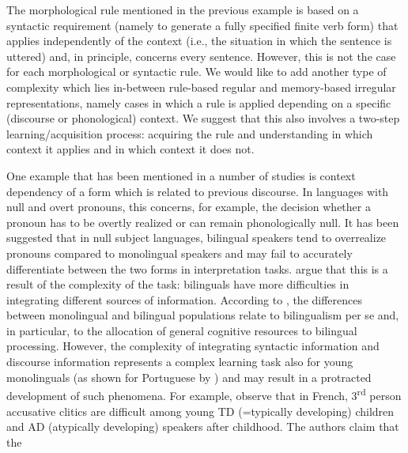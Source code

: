 \documentclass[output=paper]{langscibook}
\begin{document}
The morphological rule mentioned in the previous example is based on a syntactic requirement (namely to generate a fully specified finite verb form) that applies independently of the context (i.e., the situation in which the sentence is uttered) and, in principle, concerns every sentence. However, this is not the case for each morphological or syntactic rule. We would like to add another type of complexity which lies in-between rule-based regular and memory-based irregular representations, namely cases in which a rule is applied depending on a specific (discourse or phonological) context. We suggest that this also involves a two-step learning\slash acquisition process: acquiring the rule and understanding in which context it applies and in which context it does not. 

One example that has been mentioned in a number of studies is context dependency of a form which is related to previous discourse. In languages with null and overt pronouns, this concerns, for example, the decision whether a pronoun has to be overtly realized or can remain phonologically null. It has been suggested that in null subject languages, bilingual speakers tend to overrealize pronouns compared to monolingual speakers and may fail to accurately differentiate between the two forms in interpretation tasks. \citet[464]{SoraceBaldo2009} argue that this is a result of the complexity of the task: bilinguals have more difficulties in integrating different sources of information. According to \citet{Sorace2011}, the differences between monolingual and bilingual populations relate to bilingualism per se and, in particular, to the allocation of general cognitive resources to bilingual processing. However, the complexity of integrating syntactic information and discourse information represents a complex learning task also for young monolinguals (as shown for Portuguese by \citealt{LoboSilva2016, RinkeFlores2018}) and may result in a protracted development of such phenomena. For example, \citet{TullerBarthez2011} observe that in French, 3\textsuperscript{rd} person accusative clitics are difficult among young TD (=typically developing) children and AD (atypically developing) speakers after childhood. The authors claim that the 
\end{document}

